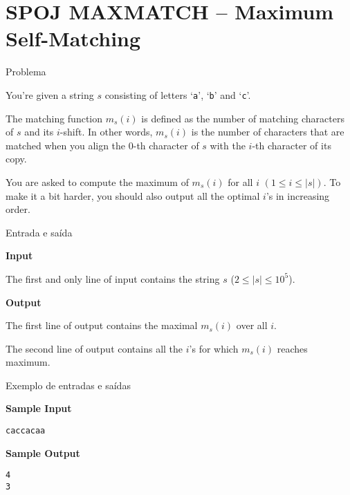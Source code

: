 \section{SPOJ MAXMATCH -- Maximum Self-Matching}

\begin{frame}[fragile]{Problema}

You're given a string $s$ consisting of letters `\texttt{a}', `\texttt{b}' and `\texttt{c}'.

The matching function $m_s(i)$ is defined as the number of matching characters of $s$ and its
$i$-shift. In other words, $m_s(i)$ is the number of characters that are matched when you align the
0-th character of $s$ with the $i$-th character of its copy.

You are asked to compute the maximum of $m_s(i)$ for all $i$ $(1\leq i\leq |s|)$. To make it a bit
harder, you should also output all the optimal $i$'s in increasing order.

\end{frame}

\begin{frame}[fragile]{Entrada e saída}

\textbf{Input}

The first and only line of input contains the string $s$ ($2\leq |s| \leq 10^5$).

\vspace{0.2in}

\textbf{Output}

The first line of output contains the maximal $m_s(i)$ over all $i$.

The second line of output contains all the $i$'s for which $m_s(i)$ reaches maximum.

\end{frame}

\begin{frame}[fragile]{Exemplo de entradas e saídas}

\begin{minipage}[t]{0.45\textwidth}
\textbf{Sample Input}
\begin{verbatim}
caccacaa
\end{verbatim}
\end{minipage}
\begin{minipage}[t]{0.5\textwidth}
\textbf{Sample Output}
\begin{verbatim}
4
3
\end{verbatim}
\end{minipage}
\end{frame}

